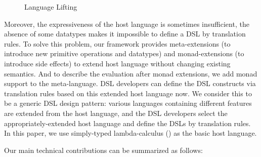 \begin{figure}[t]
  
  \caption{Language Lifting}
  \label{fig:layers}
\end{figure}

Moreover, the expressiveness of the host language is sometimes insufficient, the absence of some datatypes makes it impossible to define a DSL by translation rules.
To solve this problem, 
 our framework provides meta-extensions (to introduce new primitive operations and datatypes) and monad-extensions (to introduce side effects)
 to extend host language without changing existing semantics.
And to describe the evaluation after monad extensions, we add monad support to the meta-language.
DSL developers can define the DSL constructs via translation rules based on this extended host language now.
We consider this to be a generic DSL design pattern:
 various languages containing different features are extended from the host language,
 and the DSL developers select the appropriately-extended host language and define the DSLs by translation rules.
In this paper, we use simply-typed lambda-calculus (\STLC) as the basic host language.

Our main technical contributions can be summarized as follows:

